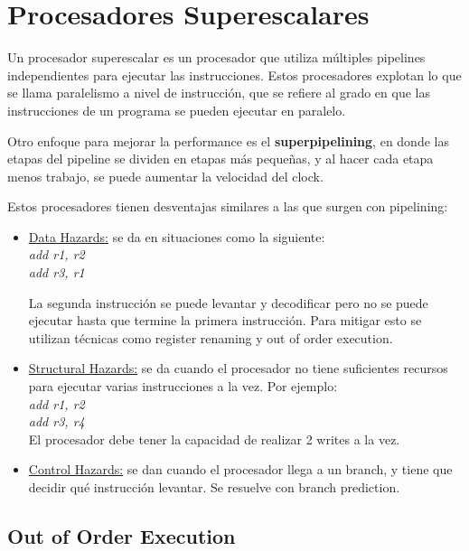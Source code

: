\newpage

\section{Procesadores Superescalares}

Un procesador superescalar es un procesador que utiliza m\'ultiples pipelines independientes para ejecutar las instrucciones. Estos procesadores
explotan lo que se llama paralelismo a nivel de instrucci\'on, que se refiere al grado en que las instrucciones de un programa se pueden 
ejecutar en paralelo.

Otro enfoque para mejorar la performance es el \textbf{superpipelining}, en donde las etapas del pipeline se dividen en etapas m\'as peque\~nas, y al
hacer cada etapa menos trabajo, se puede aumentar la velocidad del clock.

Estos procesadores tienen desventajas similares a las que surgen con pipelining:

\begin{itemize}
 \item \underline{Data Hazards:} se da en situaciones como la siguiente:\\
 \textit{add r1, r2}\\
 \textit{add r3, r1}
 
 La segunda instrucci\'on se puede levantar y decodificar pero no se puede ejecutar hasta que termine la primera instrucci\'on. Para
 mitigar esto se utilizan t\'ecnicas como register renaming y out of order execution.
 
 \item \underline{Structural Hazards:} se da cuando el procesador no tiene suficientes recursos para ejecutar varias instrucciones a la vez.
 Por ejemplo: \\
 \textit{add r1, r2}\\
 \textit{add r3, r4}\\
 El procesador debe tener la capacidad de realizar 2 writes a la vez.
 
 \item \underline{Control Hazards:} se dan cuando el procesador llega a un branch, y tiene que decidir qu\'e instrucci\'on levantar. Se resuelve
 con branch prediction.
\end{itemize}


\subsection{Out of Order Execution}

